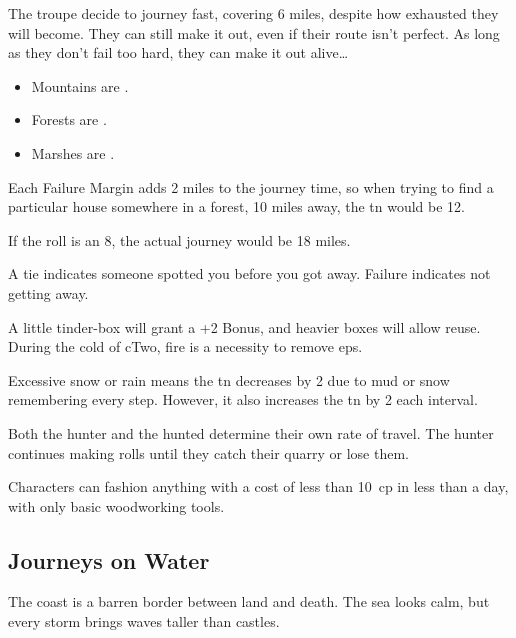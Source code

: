 \begin{multicols}{2}
\begin{exampletext}
  The troupe decide to journey fast, covering 6 miles, despite how exhausted they will become.
  They can still make it out, even if their route isn't perfect.
  As long as they don't fail too hard, they can make it out alive\ldots
\end{exampletext}

\begin{multicols}{2}
\begin{itemize}
  \item
    Mountains are \tn[8].
  \item
    Forests are \tn[11].
  \item
    Marshes are \tn[12].
\end{itemize}

Each Failure Margin adds 2 miles to the journey time, so when trying to find a particular house somewhere in a forest, 10 miles away, the \gls{tn} would be 12.
\end{multicols}
\noindent
If the roll is an 8, the actual journey would be 18 miles.

A tie indicates someone spotted you before you got away.
Failure indicates not getting away.

A little tinder-box will grant a +2 Bonus, and heavier boxes will allow reuse.
During the cold of \gls{cTwo}, fire is a necessity to remove \glspl{ep}.

Excessive snow or rain means the \gls{tn} decreases by 2 due to mud or snow remembering every step.
However, it also increases the \gls{tn} by 2 each \gls{interval}.

Both the hunter and the hunted determine their own rate of travel.
The hunter continues making rolls until they catch their quarry or lose them.

Characters can fashion anything with a cost of less than 10~\gls{cp} in less than a day, with only basic woodworking tools.

\subsection{Journeys on Water}

The coast is a barren border between land and death.
The sea looks calm, but every \gls{storm} brings waves taller than castles.


\end{multicols}
